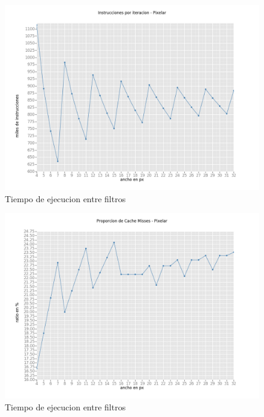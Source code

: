 \documentclass[a4paper]{article}
\begin{document}
\begin{figure}[!htb]
  \begin{center}
	\includegraphics[scale=0.6]{imagenes/diagramas/graficos/LowWidthInstruccionesPixelar.png}
	\caption{Tiempo de ejecucion entre filtros}
	\label{LowWidthInstruccionesPixelar}
  \end{center}
\end{figure}

\begin{figure}[!htb]
  \begin{center}
	\includegraphics[scale=0.6]{imagenes/diagramas/graficos/LowWidthCacheMissesPixelar.png}
	\caption{Tiempo de ejecucion entre filtros}
	\label{LowWidthCacheMissesPixelar}
  \end{center}
\end{figure}
\end{document}
